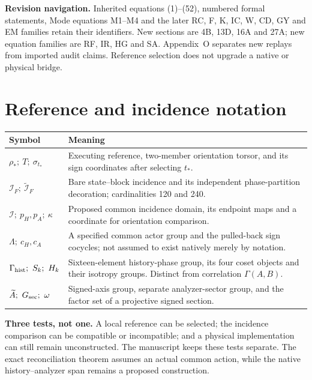 \medskip
\noindent\textbf{Revision navigation.} Inherited equations (1)--(52), numbered formal statements, Mode equations M1--M4 and the later RC, F, K, IC, W, CD, GY and EM families retain their identifiers. New sections are 4B, 13D, 16A and 27A; new equation families are RF, IR, HG and SA. Appendix~O separates new replays from imported audit claims. Reference selection does not upgrade a native or physical bridge.

\clearpage
\section*{Reference and incidence notation}
\small
\noindent\begin{tabularx}{\textwidth}{@{}p{}X@{}}
\toprule
Symbol & Meaning \\
\midrule
$\rho_*;\ T;\ \sigma_{t_*}$ & Executing reference, two-member orientation torsor, and its sign coordinates after selecting $t_*$. \\
$\mathcal I_F;\ \widetilde{\mathcal I}_F$ & Bare state--block incidence and its independent phase-partition decoration; cardinalities 120 and 240. \\
$\mathcal I;\ p_H,p_A;\ \kappa$ & Proposed common incidence domain, its endpoint maps and a coordinate for orientation comparison. \\
$\Lambda;\ c_H,c_A$ & A specified common actor group and the pulled-back sign cocycles; not assumed to exist natively merely by notation. \\
$\Gamma_{\rm hist};\ S_k;\ H_k$ & Sixteen-element history-phase group, its four coset objects and their isotropy groups. Distinct from correlation $\Gamma(A,B)$. \\
$\widetilde A;\ G_{\rm sec};\ \omega$ & Signed-axis group, separate analyzer-sector group, and the factor set of a projective signed section. \\
\bottomrule
\end{tabularx}
\normalsize
\medskip
\noindent\textbf{Three tests, not one.} A local reference can be selected; the incidence comparison can be compatible or incompatible; and a physical implementation can still remain unconstructed. The manuscript keeps these tests separate. The exact reconciliation theorem assumes an actual common action, while the native history--analyzer span remains a proposed construction.
\clearpage
